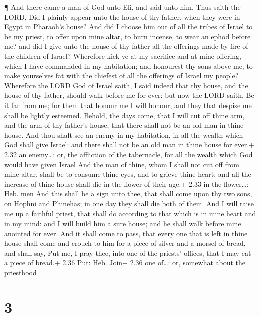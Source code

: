  ¶ And there came a man of God unto Eli, and said unto him,
Thus saith the LORD, Did I plainly appear unto the house of thy father,
when they were in Egypt in Pharaoh's house?  And did I
choose him out of all the tribes of Israel to be my priest, to offer
upon mine altar, to burn incense, to wear an ephod before me? and did I
give unto the house of thy father all the offerings made by fire of the
children of Israel?  Wherefore kick ye at my sacrifice and
at mine offering, which I have commanded in my habitation; and honourest
thy sons above me, to make yourselves fat with the chiefest of all the
offerings of Israel my people?  Wherefore the LORD God of
Israel saith, I said indeed that thy house, and the house of thy father,
should walk before me for ever: but now the LORD saith, Be it far from
me; for them that honour me I will honour, and they that despise me
shall be lightly esteemed.  Behold, the days come, that I
will cut off thine arm, and the arm of thy father's house, that there
shall not be an old man in thine house.  And thou shalt see
an enemy in my habitation, in all the wealth which God shall give
Israel: and there shall not be an old man in thine house for ever.+ 2.32
an enemy\ldots: or, the affliction of the tabernacle, for all the wealth
which God would have given Israel  And the man of thine,
whom I shall not cut off from mine altar, shall be to consume thine
eyes, and to grieve thine heart: and all the increase of thine house
shall die in the flower of their age.+ 2.33 in the flower\ldots: Heb.
men  And this shall be a sign unto thee, that shall come
upon thy two sons, on Hophni and Phinehas; in one day they shall die
both of them.  And I will raise me up a faithful priest,
that shall do according to that which is in mine heart and in my mind:
and I will build him a sure house; and he shall walk before mine
anointed for ever.  And it shall come to pass, that every
one that is left in thine house shall come and crouch to him for a piece
of silver and a morsel of bread, and shall say, Put me, I pray thee,
into one of the priests' offices, that I may eat a piece of bread.+ 2.36
Put: Heb. Join+ 2.36 one of\ldots: or, somewhat about the priesthood

\hypertarget{section-2}{%
\section{3}\label{section-2}}

